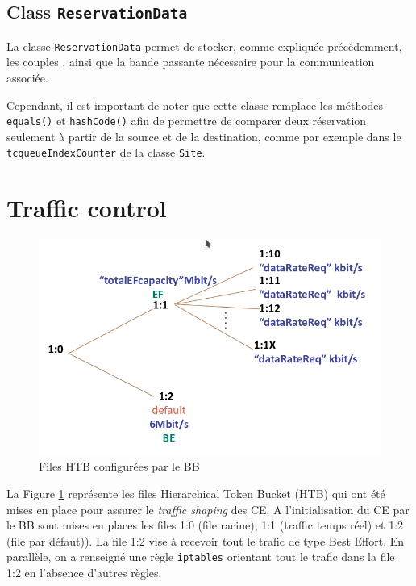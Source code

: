 \documentclass[a4paper,11pt]{article}
\let\Oldsection\section
\renewcommand{\section}{\FloatBarrier\Oldsection}
\let\Oldsubsection\subsection
\renewcommand{\subsection}{\FloatBarrier\Oldsubsection}
\begin{document}
\subsection{Class \texttt{ReservationData}}

La classe \texttt{ReservationData} permet de stocker, comme expliquée précédemment, les couples , ainsi que la bande passante nécessaire pour la communication associée.

Cependant, il est important de noter que cette classe remplace les méthodes \texttt{equals()} et \texttt{hashCode()} afin de permettre de comparer deux réservation seulement à partir de la source et de la destination, comme par exemple dans le \texttt{tcqueueIndexCounter} de la classe \texttt{Site}.


\section{Traffic control}

\begin{figure}[htp]
    \centering
    \includegraphics[width=\textwidth]{images/tc.png}
    \caption{Files HTB configurées par le BB}
    \label{fig:htb-files}
\end{figure}

La Figure \ref{fig:htb-files} représente les files Hierarchical Token Bucket (HTB) qui ont été mises en place pour assurer le \emph{traffic shaping} des CE. 
A l’initialisation du CE par le BB sont mises en places les files 1:0 (file racine), 1:1 (traffic temps réel) et 1:2 (file par défaut)). La file 1:2 vise à recevoir tout le trafic de type Best Effort. En parallèle, on a renseigné une règle \texttt{iptables} orientant tout le trafic dans la file 1:2 en l'absence d'autres règles.
\end{document}
